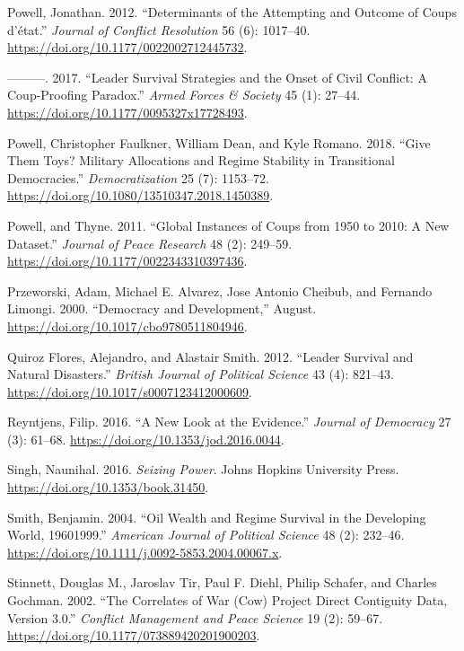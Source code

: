 \documentclass[
  12pt,
]{report}
\newlength{\cslhangindent}
\newenvironment{CSLReferences}[2] %
 {\begin{list}{}{%
  \setlength{\itemindent}{0pt}
  \setlength{\leftmargin}{0pt}
  \setlength{\parsep}{0pt}
  \ifodd #1
   \setlength{\leftmargin}{\cslhangindent}
   \setlength{\itemindent}{-1\cslhangindent}
  \fi
  \setlength{\itemsep}{#2\baselineskip}}}
 {\end{list}}
\begin{document}
\begin{CSLReferences}{1}{0}
Powell, Jonathan. 2012. {``Determinants of the Attempting and Outcome of
Coups d{'}état.''} \emph{Journal of Conflict Resolution} 56 (6):
1017--40. \url{https://doi.org/10.1177/0022002712445732}.

---------. 2017. {``Leader Survival Strategies and the Onset of Civil
Conflict: A Coup-Proofing Paradox.''} \emph{Armed Forces \& Society} 45
(1): 27--44. \url{https://doi.org/10.1177/0095327x17728493}.

Powell, Christopher Faulkner, William Dean, and Kyle Romano. 2018.
{``Give Them Toys? Military Allocations and Regime Stability in
Transitional Democracies.''} \emph{Democratization} 25 (7): 1153--72.
\url{https://doi.org/10.1080/13510347.2018.1450389}.

Powell, and Thyne. 2011. {``Global Instances of Coups from 1950 to 2010:
A New Dataset.''} \emph{Journal of Peace Research} 48 (2): 249--59.
\url{https://doi.org/10.1177/0022343310397436}.

Przeworski, Adam, Michael E. Alvarez, Jose Antonio Cheibub, and Fernando
Limongi. 2000. {``Democracy and Development,''} August.
\url{https://doi.org/10.1017/cbo9780511804946}.

Quiroz Flores, Alejandro, and Alastair Smith. 2012. {``Leader Survival
and Natural Disasters.''} \emph{British Journal of Political Science} 43
(4): 821--43. \url{https://doi.org/10.1017/s0007123412000609}.

Reyntjens, Filip. 2016. {``A New Look at the Evidence.''} \emph{Journal
of Democracy} 27 (3): 61--68.
\url{https://doi.org/10.1353/jod.2016.0044}.

Singh, Naunihal. 2016. \emph{Seizing Power}. Johns Hopkins University
Press. \url{https://doi.org/10.1353/book.31450}.

Smith, Benjamin. 2004. {``Oil Wealth and Regime Survival in the
Developing World, 1960{\textendash}1999.''} \emph{American Journal of
Political Science} 48 (2): 232--46.
\url{https://doi.org/10.1111/j.0092-5853.2004.00067.x}.

Stinnett, Douglas M., Jaroslav Tir, Paul F. Diehl, Philip Schafer, and
Charles Gochman. 2002. {``The Correlates of War (Cow) Project Direct
Contiguity Data, Version 3.0.''} \emph{Conflict Management and Peace
Science} 19 (2): 59--67.
\url{https://doi.org/10.1177/073889420201900203}.


\end{CSLReferences}
\end{document}
